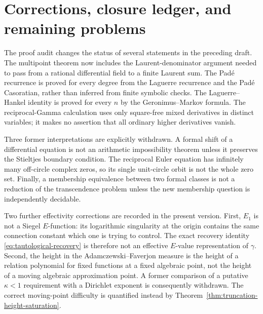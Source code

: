 \documentclass[11pt]{article}
\theoremstyle{definition}
\theoremstyle{remark}
\begin{document}














\section{Corrections, closure ledger, and remaining problems}

The proof audit changes the status of several statements in the preceding
draft.  The multipoint theorem now includes the Laurent-denominator argument
needed to pass from a rational differential field to a finite Laurent sum.
The Pad\'e recurrence is proved for every degree from the Laguerre recurrence
and the Pad\'e Casoratian, rather than inferred from finite symbolic checks.
The Laguerre--Hankel identity is proved for every \(n\) by the
Geronimus--Markov formula.  The reciprocal-Gamma calculation uses only
square-free mixed derivatives in distinct variables; it makes no assertion
that all ordinary higher derivatives vanish.

Three former interpretations are explicitly withdrawn.  A formal shift of a
differential equation is not an arithmetic impossibility theorem unless it
preserves the Stieltjes boundary condition.  The reciprocal Euler equation
has infinitely many off-circle complex zeros, so its single unit-circle orbit
is not the whole zero set.  Finally, a membership equivalence between two
formal classes is not a reduction of the transcendence problem unless the
new membership question is independently decidable.

Two further effectivity corrections are recorded in the present version.
First, \(E_1\) is not a Siegel \(E\)-function: its logarithmic singularity
at the origin contains the same connection constant which one is trying to
control.  The exact recovery identity
\eqref{eq:tautological-recovery} is therefore not an effective
\(E\)-value representation of \(\gamma\).  Second, the height in the
Adamczewski--Faverjon measure is the height of a relation polynomial for
fixed functions at a fixed algebraic point, not the height of a moving
algebraic approximation point.  A former comparison of a putative
\(\kappa<1\) requirement with a Dirichlet exponent is consequently
withdrawn.  The correct moving-point difficulty is quantified instead by
Theorem~\ref{thm:truncation-height-saturation}.
\end{document}
